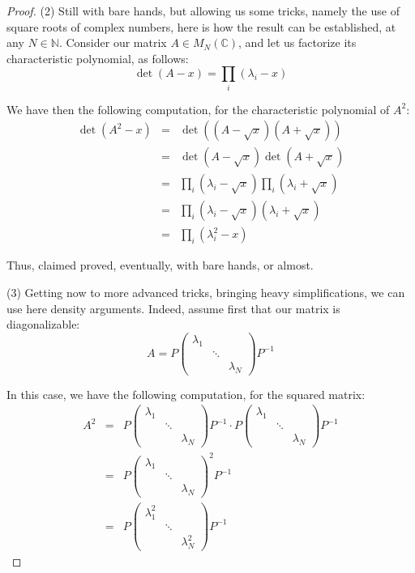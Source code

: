 \documentclass[10pt,a4paper]{amsart}
\begin{document}
\begin{proof}
(2) Still with bare hands, but allowing us some tricks, namely the use of square roots of complex numbers, here is how the result can be established, at any $N\in\mathbb N$. Consider our matrix $A\in M_N(\mathbb C)$, and let us factorize its characteristic polynomial, as follows:
$$\det(A-x)=\prod_i(\lambda_i-x)$$

We have then the following computation, for the characteristic polynomial of $A^2$:
\begin{eqnarray*}
\det(A^2-x)
&=&\det((A-\sqrt{x})(A+\sqrt{x}))\\
&=&\det(A-\sqrt{x})\det(A+\sqrt{x})\\
&=&\prod_i(\lambda_i-\sqrt{x})\prod_i(\lambda_i+\sqrt{x})\\
&=&\prod_i(\lambda_i-\sqrt{x})(\lambda_i+\sqrt{x})\\
&=&\prod_i(\lambda_i^2-x)
\end{eqnarray*}

Thus, claimed proved, eventually, with bare hands, or almost.

\medskip

(3) Getting now to more advanced tricks, bringing heavy simplifications, we can use here density arguments. Indeed, assume first that our matrix is diagonalizable:
$$A=P\begin{pmatrix}
\lambda_1\\
&\ddots\\
&&\lambda_N
\end{pmatrix}
P^{-1}$$

In this case, we have the following computation, for the squared matrix:
\begin{eqnarray*}
A^2
&=&P\begin{pmatrix}
\lambda_1\\
&\ddots\\
&&\lambda_N
\end{pmatrix}
P^{-1}\cdot P\begin{pmatrix}
\lambda_1\\
&\ddots\\
&&\lambda_N
\end{pmatrix}
P^{-1}\\
&=&P\begin{pmatrix}
\lambda_1\\
&\ddots\\
&&\lambda_N
\end{pmatrix}^2
P^{-1}\\
&=&P\begin{pmatrix}
\lambda_1^2\\
&\ddots\\
&&\lambda_N^2
\end{pmatrix}
P^{-1}
\end{eqnarray*}


\end{proof}
\end{document}
